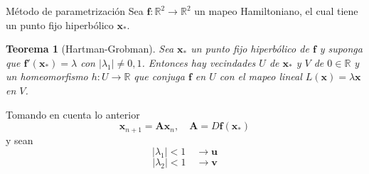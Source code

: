 \documentclass[11pt]{beamer}
\newtheorem{teorema}[theorem]{Teorema}
\theoremstyle{definition}
\begin{document}
\begin{frame}{M\'etodo de parametrizaci\'on}
Sea $\mathbf{f}:\mathbb{R}^{2}\rightarrow\mathbb{R}^{2}$ un mapeo Hamiltoniano, el cual tiene un punto fijo hiperb\'olico $\mathbf{x}_{*}$.\\
\begin{teorema}[Hartman-Grobman]
Sea $\mathbf{x}_{*}$ un punto fijo hiperb\'olico de $\mathbf{f}$ y suponga que $\mathbf{f'}(\mathbf{x_{*}})=\lambda$ con $ \vert \lambda_{1}\vert\neq 0,1 $. Entonces hay vecindades $U$ de $\mathbf{x_{*}}$ y $V$ de $0\in\mathbb{R}$ y un homeomorfismo $h:U\rightarrow\mathbb{R}$ que conjuga $\mathbf{f}$ en $U$ con el mapeo lineal $L(\mathbf{x})=\lambda\mathbf{x}$  en $V$.
\end{teorema}
Tomando en cuenta lo anterior
\begin{equation}
\mathbf{x}_{n+1} =\mathbf{A}\mathbf{x}_{n}, \quad \mathbf{A}=D\mathbf{f}(\mathbf{x}_{*})
\label{sistema_lineal}
\end{equation}
y sean \\
\begin{equation}
\vert \lambda_{1}\vert<1 \quad \rightarrow \mathbf{u}
\label{primer_valorp}
\end{equation}
\begin{equation}
\vert \lambda_{2}\vert<1 \quad \rightarrow \mathbf{v}
\label{segundo_valorp}
\end{equation}

\end{frame}
\end{document}
